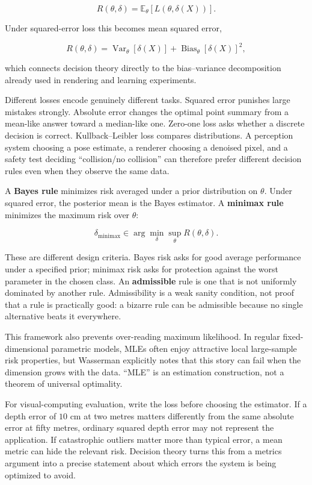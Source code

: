 \[
R(\theta,\delta)
=
\mathbb E_\theta[
L(\theta,\delta(X))
].
\]

Under squared-error loss this becomes mean squared error,

\[
R(\theta,\delta)
=
\operatorname{Var}_\theta[\delta(X)]
+
\operatorname{Bias}_\theta[\delta(X)]^2,
\]

which connects decision theory directly to the bias--variance decomposition already used in rendering and learning experiments.

Different losses encode genuinely different tasks. Squared error punishes large mistakes strongly. Absolute error changes the optimal point summary from a mean-like answer toward a median-like one. Zero-one loss asks whether a discrete decision is correct. Kullback--Leibler loss compares distributions. A perception system choosing a pose estimate, a renderer choosing a denoised pixel, and a safety test deciding ``collision/no collision'' can therefore prefer different decision rules even when they observe the same data.

A \textbf{Bayes rule} minimizes risk averaged under a prior distribution on \(\theta\). Under squared error, the posterior mean is the Bayes estimator. A \textbf{minimax rule} minimizes the maximum risk over \(\theta\):

\[
\delta_{\mathrm{minimax}}
\in
\arg\min_\delta
\sup_{\theta}R(\theta,\delta).
\]

These are different design criteria. Bayes risk asks for good average performance under a specified prior; minimax risk asks for protection against the worst parameter in the chosen class. An \textbf{admissible} rule is one that is not uniformly dominated by another rule. Admissibility is a weak sanity condition, not proof that a rule is practically good: a bizarre rule can be admissible because no single alternative beats it everywhere.

This framework also prevents over-reading maximum likelihood. In regular fixed-dimensional parametric models, MLEs often enjoy attractive local large-sample risk properties, but Wasserman explicitly notes that this story can fail when the dimension grows with the data. ``MLE'' is an estimation construction, not a theorem of universal optimality.

For visual-computing evaluation, write the loss before choosing the estimator. If a depth error of \(10\) cm at two metres matters differently from the same absolute error at fifty metres, ordinary squared depth error may not represent the application. If catastrophic outliers matter more than typical error, a mean metric can hide the relevant risk. Decision theory turns this from a metrics argument into a precise statement about which errors the system is being optimized to avoid.


